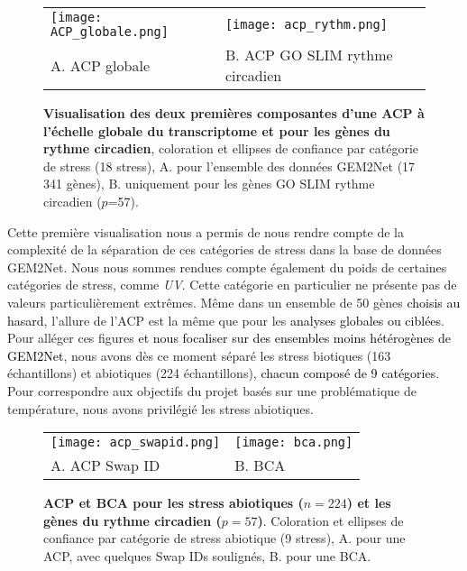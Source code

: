\documentclass[twoside]{article}
\newcommand{\AR}[1]{\textcolor{black}{#1}}
\begin{document}
    \begin{figure}[h]
        \centering
        \begin{tabular}{p{90mm}p{90mm}}
        \texttt{[image: ACP\_globale.png]} &
        \texttt{[image: acp\_rythm.png]} \\
        \centering A. ACP globale & \centering B. ACP GO SLIM rythme circadien\\[6pt]
        \end{tabular}
        \caption[ACP à l'échelle globale du transcriptome et pour les gènes du rythme circadien]{\textbf{Visualisation des deux premières composantes d'une ACP à l'échelle globale du transcriptome et pour les gènes du rythme circadien}, coloration et ellipses de confiance par catégorie de stress (18 stress), A. pour l'ensemble des données GEM2Net (17 341 gènes), B. uniquement pour les gènes GO SLIM rythme circadien ($p$=57).\label{fig:pca}}
    \end{figure}

\vspace{0.5cm}Cette première visualisation nous a permis de nous rendre compte de la complexité de la séparation de ces catégories de stress dans la base de données GEM2Net. Nous nous sommes rendues compte également du poids de certaines catégories de stress, comme \textit{UV}. Cette catégorie en particulier ne présente pas de valeurs particulièrement extrêmes. Même dans un ensemble de 50 gènes \AR{choisis au hasard}, l'allure de l'ACP est la même que pour les \AR{analyses globales ou ciblées}. Pour alléger ces figures \AR{et nous focaliser sur des ensembles moins hétérogènes de GEM2Net}, nous avons dès ce moment séparé les stress biotiques (163 échantillons) et abiotiques (224 échantillons), \AR{chacun composé de 9 catégories}. Pour correspondre aux objectifs du projet basés sur une problématique de température, nous avons privilégié les stress abiotiques.

    \begin{figure}[h]
        \centering
        \begin{tabular}{p{90mm}p{90mm}}
        \texttt{[image: acp\_swapid.png]} &
        \texttt{[image: bca.png]} \\
        \centering A. ACP Swap ID & \centering B. BCA\\[6pt]
        \end{tabular}
        \caption[ACP et BCA pour les stress abiotiques et les gènes du rythme circadien]{\textbf{ACP et BCA pour les stress abiotiques ($n=224$) et les gènes du rythme circadien ($p=57$)}. Coloration et ellipses de confiance par catégorie de stress abiotique (9 stress), A. pour une ACP, avec quelques Swap IDs soulignés, B. pour une BCA. \label{fig:bca}}
    \end{figure}
    
\end{document}
